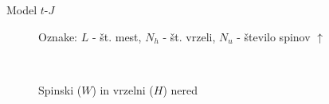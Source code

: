 \documentclass[1pt]{beamer}
\begin{document}
\begin{frame}{Model $t$-$J$}
{\begin{minipage}{0.09\textwidth}
\end{minipage}
\begin{minipage}{0.88\textwidth}
\begin{figure}
\caption{Oznake: $L$ - št. mest, $N_h$ - št. vrzeli, $N_u$ - število spinov $\uparrow$}
\end{figure} 
\end{minipage}\\
\begin{figure}
\caption{Spinski ($W$) in vrzelni ($H$) nered}
\end{figure}

}
\end{frame}
\end{document}
